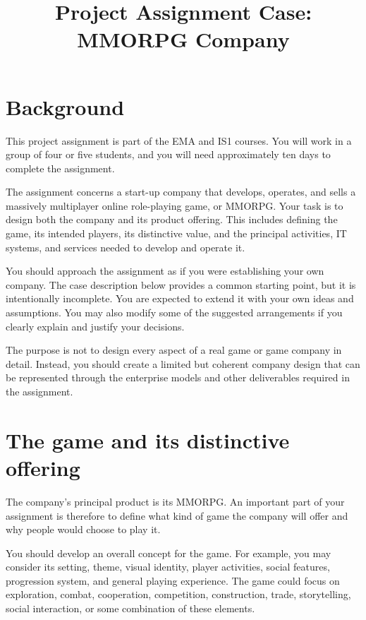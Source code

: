 \documentclass[12pt,a4paper]{article}
\title{\textbf{Project Assignment Case: MMORPG Company}}
\begin{document}
\maketitle

\section*{Background}

This project assignment is part of the EMA and IS1 courses. You will work in a group of four or five students, and you will need
approximately ten days to complete the assignment.

The assignment concerns a start-up company that develops, operates, and sells a massively multiplayer online role-playing game, or
MMORPG. Your task is to design both the company and its product offering. This includes defining the game, its intended players, its
distinctive value, and the principal activities, IT systems, and services needed to develop and operate it.

You should approach the assignment as if you were establishing your own company. The case description below provides a common
starting point, but it is intentionally incomplete. You are expected to extend it with your own ideas and assumptions. You may also
modify some of the suggested arrangements if you clearly explain and justify your decisions.

The purpose is not to design every aspect of a real game or game company in detail. Instead, you should create a limited but
coherent company design that can be represented through the enterprise models and other deliverables required in the assignment.

\section*{The game and its distinctive offering}

The company's principal product is its MMORPG. An important part of your assignment is therefore to define what kind of game the
company will offer and why people would choose to play it.

You should develop an overall concept for the game. For example, you may consider its setting, theme, visual identity, player
activities, social features, progression system, and general playing experience. The game could focus on exploration, combat,
cooperation, competition, construction, trade, storytelling, social interaction, or some combination of these elements.
\end{document}
